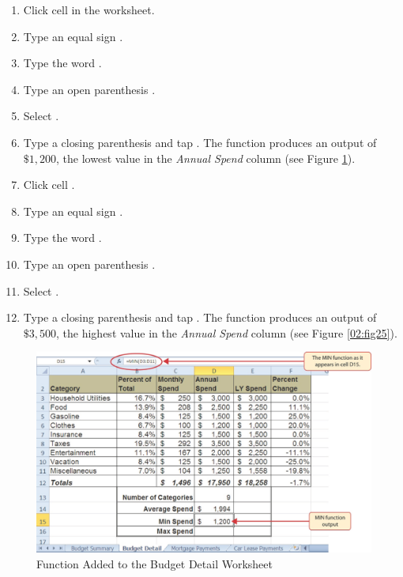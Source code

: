 \begin{enumbox}
	\begin{enumerate}
		\item Click cell  in the  worksheet.
		\item Type an equal sign \fmtTyping{=}.
		\item Type the word .
		\item Type an open parenthesis \fmtTyping{(}.
		\item Select .
		\item Type a closing parenthesis \fmtTyping{)} and tap . The  function produces an output of $ \$1,200 $, the lowest value in the \textit{Annual Spend} column (see Figure \ref{02:fig24}).
		\item Click cell .
		\item Type an equal sign \fmtTyping{=}.
		\item Type the word .
		\item Type an open parenthesis \fmtTyping{(}.
		\item Select .
		\item Type a closing parenthesis \fmtTyping{)} and tap . The  function produces an output of $ \$3,500 $, the highest value in the \textit{Annual Spend} column (see Figure \ref{02:fig25}).
	\end{enumerate}
\end{enumbox}

\begin{figure}[H]
	\centering
	\includegraphics[width=\maxwidth{.95\linewidth}]{gfx/ch02_fig24}
	\caption{ Function Added to the Budget Detail Worksheet}
	\label{02:fig24}
\end{figure}

